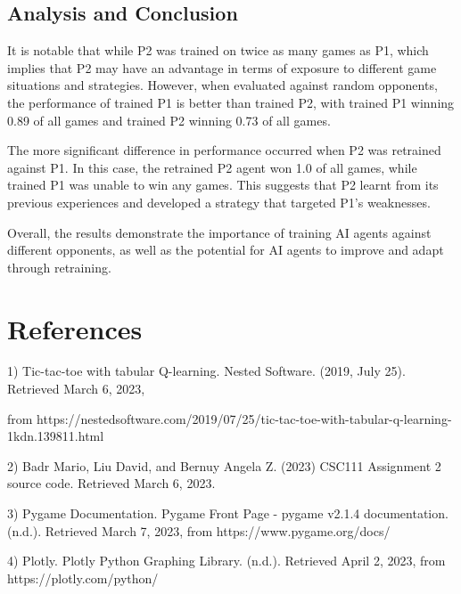 \documentclass{article}
\begin{document}
\subsection{Analysis and Conclusion}

It is notable that while P2 was trained on twice as many games as P1, which implies that P2 may have an advantage in terms of exposure to different game situations and strategies. However, when evaluated against random opponents, the performance of trained P1 is better than trained P2, with trained P1 winning 0.89 of all games and trained P2 winning 0.73 of all games.

The more significant difference in performance occurred when P2 was retrained against P1. In this case, the retrained P2 agent won 1.0 of all games, while trained P1 was unable to win any games. This suggests that P2 learnt from its previous experiences and developed a strategy that targeted P1's weaknesses.

Overall, the results demonstrate the importance of training AI agents against different opponents, as well as the potential for AI agents to improve and adapt through retraining.


\section{References}

1) Tic-tac-toe with tabular Q-learning. Nested Software. (2019, July 25). Retrieved March 6, 2023,

from https://nestedsoftware.com/2019/07/25/tic-tac-toe-with-tabular-q-learning-1kdn.139811.html

2) Badr Mario, Liu David, and Bernuy Angela Z. (2023) CSC111 Assignment 2 source code. Retrieved March 6, 2023.

3) Pygame Documentation. Pygame Front Page - pygame v2.1.4 documentation. (n.d.). Retrieved March 7, 2023, from https://www.pygame.org/docs/

4) Plotly. Plotly Python Graphing Library. (n.d.). Retrieved April 2, 2023, from https://plotly.com/python/ 
\end{document}
